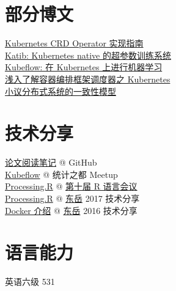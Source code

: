 \documentclass[]{deedy-resume-openfont}
\begin{document}
\begin{minipage}[t]{0.3\textwidth}
\section{部分博文}
\sectionsep
\href{http://gaocegege.com/Blog/kubernetes/operator}{Kubernetes CRD Operator 实现指南} \\
\href{http://gaocegege.com/Blog/%E6%9C%BA%E5%99%A8%E5%AD%A6%E4%B9%A0/katib}{Katib: Kubernetes native 的超参数训练系统} \\
\href{http://gaocegege.com/Blog/ml%20system/kubeflow}{Kubeflow: 在 Kubernetes 上进行机器学习} \\
\href{http://gaocegege.com/Blog/%E6%BA%90%E7%A0%81%E5%88%86%E6%9E%90/kubernetes-scheduler}{浅入了解容器编排框架调度器之 Kubernetes} \\
\href{http://gaocegege.com/Blog/%E9%9A%8F%E7%AC%94/consistency}{小议分布式系统的一致性模型} \\
\sectionsep

\section{技术分享}
\sectionsep
\href{https://github.com/gaocegege/papers-notebook}{论文阅读笔记} @ GitHub \\
\href{https://docs.google.com/presentation/d/1ED24TCnlBVzyJz0aCEAtXQQh0_W1RKSeapP3QZ0fTKA/edit?usp=sharing}{Kubeflow} @ 统计之都 Meetup \\
\href{http://slides.com/gaocegege/processing-r}{Processing.R} @ \href{http://china-r.org/sh2017/index.html}{第十届 R 语言会议} \\
\href{https://docs.google.com/presentation/d/1ylRT4VvydWbR7SyTQzNZOLpkXtgSZJiEl5nmXY1KuJw/edit?usp=sharing}{Processing.R} @ \href{https://zhuanlan.zhihu.com/dongyue}{东岳} 2017 技术分享 \\
\href{https://docs.google.com/presentation/d/1Ru4Dm9TLoyxnJgFqvsCHrb82VT622H-zBSgAe1vJL44/edit?usp=sharing}{Docker 介绍}  @ \href{https://zhuanlan.zhihu.com/dongyue}{东岳} 2016 技术分享 \\
\sectionsep

\section{语言能力}
\sectionsep
英语六级 531 \\
\sectionsep



\end{minipage}
\end{document}
